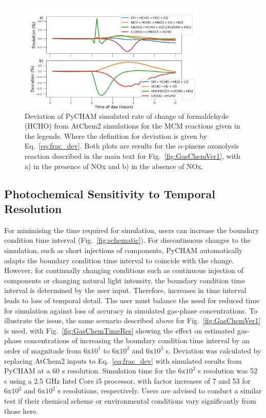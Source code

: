 \documentclass[gmd, manuscript]{copernicus}
\begin{document}
\begin{figure}[t]
\includegraphics[width=9.0cm]{Results/photo_chem_grad_dev.png}
\caption{Deviation of PyCHAM simulated rate of change of formaldehyde (HCHO) from AtChem2 simulations for the MCM reactions given in the legends.  Where the definition for deviation is given by Eq.~\ref{eq:frac_dev}.  Both plots are results for the $\alpha$-pinene ozonolysis reaction described in the main text for Fig.~\ref{fig:GasChemVer1}, with a) in the presence of NOx and b) in the absence of NOx.}
\label{fig:GasChemVer2}
\end{figure}


\subsection{Photochemical Sensitivity to Temporal Resolution}

For minimising the time required for simulation, users can increase the boundary condition time interval (Fig.~\ref{fig:schematic}).  For discontinuous changes to  the simulation, such as short injections of components, PyCHAM automatically adapts the boundary condition time interval to coincide with the change.  However, for continually changing conditions such as continuous injection of components or changing natural light intensity, the boundary condition time interval is determined by the user input.  Therefore, increases in time interval leads to loss of temporal detail.  The user must balance the need for reduced time for simulation against loss of accuracy in simulated gas-phase concentrations.  To illustrate the issue, the same scenario described above for Fig.~\ref{fig:GasChemVer1} is used, with Fig.~\ref{fig:GasChemTimeRes} showing the effect on estimated gas-phase concentrations of increasing the boundary condition time interval by an order of magnitude from $\mathrm{6x10^1}$ to $\mathrm{6x10^2}$ and $\mathrm{6x10^3}$ s.  Deviation was calculated by replacing AtChem2 inputs to Eq.~\ref{eq:frac_dev} with simulated results from PyCHAM at a 60 s resolution.  Simulation time for the $\mathrm{6x10^3}$ s resolution was 52 s using a 2.5 GHz Intel Core i5 processor, with factor increases of 7 and 53 for $\mathrm{6x10^2}$ and $\mathrm{6x10^2}$ s resolutions, respectively.  Users are advised to conduct a similar test if their chemical scheme or environmental conditions vary significantly from those here.
\end{document}
